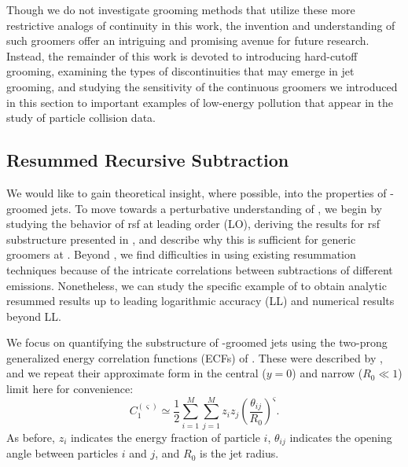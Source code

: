Though we do not investigate grooming methods that utilize these more restrictive analogs of continuity in this work, the invention and understanding of such groomers offer an intriguing and promising avenue for future research.
%
Instead, the remainder of this work is devoted to introducing hard-cutoff grooming, examining the types of discontinuities that may emerge in jet grooming, and studying the sensitivity of the continuous groomers we introduced in this section to important examples of low-energy pollution that appear in the study of particle collision data.




\subsection[Resummed Recursive Subtraction]{Resummed Recursive Subtraction}
\label{sec:pira-resummed}


We would like to gain theoretical insight, where possible, into the properties of \PIRANHA{}-groomed jets.
%
To move towards a perturbative understanding of \PIRANHA{}, we begin by studying the behavior of \gls{rsf} at leading order (LO), deriving the results for \gls{rsf} substructure presented in , and describe why this is sufficient for generic \PIRANHA{} groomers at .
%
Beyond , we find difficulties in using existing resummation techniques because of the intricate correlations between subtractions of different emissions.
%
Nonetheless, we can study the specific example of  to obtain analytic resummed results up to leading logarithmic accuracy (LL) and numerical results beyond LL.


We focus on quantifying the substructure of \PIRANHA{}-groomed jets using the two-prong generalized energy correlation functions (ECFs) of .
%
These were described by , and we repeat their approximate form in the central (\(y=0\)) and narrow (\(R_0 \ll 1\)) limit here for convenience:
\begin{equation}
    C_1^{(\varsigma)} \simeq \frac{1}{2}\sum_{i=1}^M\sum_{j=1}^M z_i z_j \left(\frac{\theta_{ij}}{R_0}\right)^\varsigma
    \label{eq:ECFdefn_repeat}
    .
\end{equation}
As before, \(z_i\) indicates the energy fraction of particle \(i\), \(\theta_{ij}\) indicates the opening angle between particles \(i\) and \(j\), and \(R_0\) is the jet radius.


